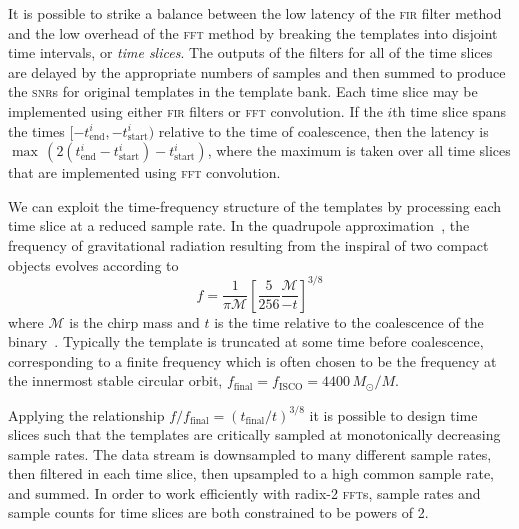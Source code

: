   It is possible to strike a balance between the low latency of the \textsc{fir} filter method and the low overhead of the \textsc{fft} method by breaking the templates into disjoint time intervals, or {\em time slices}.  The outputs of the filters for all of the time slices are delayed by the appropriate numbers of samples and then summed to produce the \textsc{snr}s for original templates in the template bank.  Each time slice may be implemented using either \textsc{fir} filters or \textsc{fft} convolution.  If the $i$th time slice spans the times $[-t_\mathrm{end}^i, -t_\mathrm{start}^i)$ relative to the time of coalescence, then the latency is $\max \, (2 (t_\mathrm{end}^i - t_\mathrm{start}^i) - t_\mathrm{start}^i)$, where the maximum is taken over all time slices that are implemented using \textsc{fft} convolution.

We can exploit the time-frequency structure of the templates by processing each time slice at a reduced sample rate.  In the quadrupole approximation~\cite{finn1993}, the frequency of gravitational radiation resulting from the inspiral of two compact objects evolves according to
\begin{equation}
\label{eq:fgw}
f = \frac{1}{\mathcal{\pi M}} \left[ \frac{5}{256}\frac{\mathcal{M}}{-t} \right]^{3/8}
\end{equation}
where $\mathcal{M}$ is the chirp mass and $t$ is the time relative to the coalescence of the binary~\cite{findchirppaper, kidder1992, blanchet2002, hanna2009}.  Typically the template is truncated at some time before coalescence, corresponding to a finite frequency which is often chosen to be the frequency at the innermost stable circular orbit, $f_\mathrm{final} = f_\mathrm{ISCO} = 4400 \, M_\odot / M$.

Applying the relationship $f/f_\mathrm{final} = (t_\mathrm{final}/t)^{3/8}$ it is possible to design time slices such that the templates are critically sampled at monotonically decreasing sample rates.  The data stream is downsampled to many different sample rates, then filtered in each time slice, then upsampled to a high common sample rate, and summed.  In order to work efficiently with radix-2 \textsc{fft}s, sample rates and sample counts for time slices are both constrained to be powers of 2.

